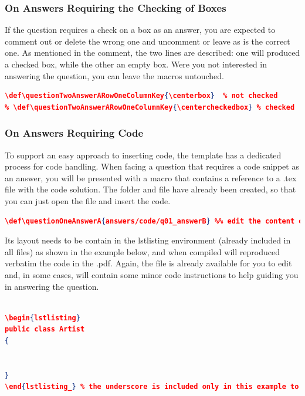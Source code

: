 \subsubsection*{On Answers Requiring the Checking of Boxes}
If the question requires a check on a box as an answer, you are expected to comment out or delete the wrong one and uncomment or leave as is the correct one.  As mentioned in the comment, the two lines are described: one will produced a checked box, while the other an empty box.  Were you not interested in answering the question, you can leave the macros untouched.  
\begin{lstlisting}[language=json,basicstyle=\ttfamily\footnotesize,numbersep=5pt,frame=trBL,framexleftmargin=1.5em]
\def\questionTwoAnswerARowOneColumnKey{\centerbox}	% not checked
% \def\questionTwoAnswerARowOneColumnKey{\centercheckedbox} % checked
\end{lstlisting}





\subsubsection*{On Answers Requiring Code}
To support an easy approach to inserting code, the template has a dedicated process for code handling.  When facing a question that requires a code snippet as an answer, you will be presented with a macro that contains a reference to a .tex file with the code solution.  The folder and file have already been created, so that you can just open the file and insert the code.  
\begin{lstlisting}[language=json,basicstyle=\ttfamily\footnotesize,numbersep=5pt,frame=trBL,framexleftmargin=1.5em]
\def\questionOneAnswerA{answers/code/q01_answerB} %% edit the content of the file
\end{lstlisting}

Its layout needs to be contain in the lstlisting environment (already included in all files) as shown in the example below, and when compiled will reproduced verbatim the code in the .pdf.
Again, the file is already available for you to edit and, in some cases, will contain some minor code instructions to help guiding you in answering the question.
\begin{lstlisting}[language=json,basicstyle=\ttfamily\footnotesize,numbersep=5pt,frame=trBL,framexleftmargin=1.5em]
%!TEX root = ../../[BDSA'21] - Exam Answers.tex

\begin{lstlisting}
public class Artist
{


}
\end{lstlisting_} % the underscore is included only in this example to avoid conflicts between the environments 
\end{lstlisting}



